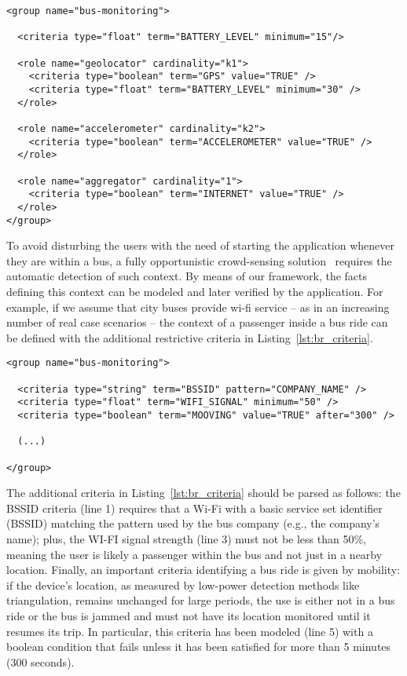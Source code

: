 \begin{lstlisting}[caption=Specification of a bus monitoring group, label=lst:bm_criteria, captionpos=t]
<group name="bus-monitoring">
  
  <criteria type="float" term="BATTERY_LEVEL" minimum="15"/>
  
  <role name="geolocator" cardinality="k1">
    <criteria type="boolean" term="GPS" value="TRUE" />
    <criteria type="float" term="BATTERY_LEVEL" minimum="30" />
  </role>
  
  <role name="accelerometer" cardinality="k2">
    <criteria type="boolean" term="ACCELEROMETER" value="TRUE" />
  </role>
  
  <role name="aggregator" cardinality="1">
    <criteria type="boolean" term="INTERNET" value="TRUE" />
  </role>
</group>
\end{lstlisting}

To avoid disturbing the users with the need of starting the application whenever they are within a bus, a fully opportunistic crowd-sensing solution~\cite{Guo:2015} requires the automatic detection of such context. By means of our framework, the facts defining this context can be modeled and later verified by the application. For example, if we assume that city buses provide wi-fi service -- as in an increasing number of real case scenarios -- the context of a passenger inside a bus ride can be defined with the additional restrictive criteria in Listing~\ref{lst:br_criteria}.

\begin{lstlisting}[caption=Additional criteria to specify a bus ride context, label=lst:br_criteria, captionpos=t]
<group name="bus-monitoring">

  <criteria type="string" term="BSSID" pattern="COMPANY_NAME" />
  <criteria type="float" term="WIFI_SIGNAL" minimum="50" />
  <criteria type="boolean" term="MOOVING" value="TRUE" after="300" />
  
  (...)

</group>
\end{lstlisting}

The additional criteria in Listing~\ref{lst:br_criteria} should be parsed as follows: the BSSID criteria (line 1) requires that a Wi-Fi with a basic service set identifier (BSSID) matching the pattern used by the bus company (e.g., the company's name); plus, the WI-FI signal strength (line 3) must not be less than 50\%, meaning the user is likely a passenger within the bus and not just in a nearby location. Finally, an important criteria identifying a bus ride is given by mobility: if the device's location, as measured by low-power detection methods like triangulation, remains unchanged for large periods, the use is either not in a bus ride or the bus is jammed and must not have its location monitored until it resumes its trip. In particular, this criteria has been modeled (line 5) with a boolean condition that fails unless it has been satisfied for more than 5 minutes (300 seconds).


